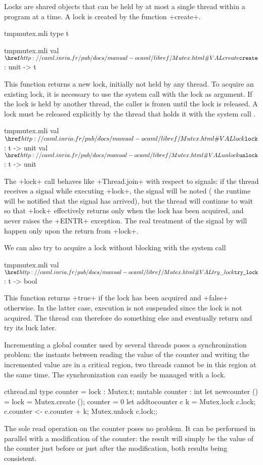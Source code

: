 Locks are shared objects that can be held by at most a single thread
within a program at a time. A lock is created by the function
\ml+create+.
%
\begin{codefile}{tmpmutex.mli}
  type t
\end{codefile}
%
\begin{listingcodefile}{tmpmutex.mli}
val $\libvalue{Mutex}{create}$ : unit -> t
\end{listingcodefile}
%
This function returns a new lock, initially not held by any thread.
To acquire an existing lock, it is necessary to use the system call
 with the lock as argument. If the lock is
held by another thread, the caller is frozen until the lock is released.
A lock must be released explicitly by the thread that holds it with
the system call .
%
\begin{listingcodefile}{tmpmutex.mli}
val $\libvalue{Mutex}{lock}$ : t -> unit
val $\libvalue{Mutex}{unlock}$ : t -> unit
\end{listingcodefile}
%
The \ml+lock+ call behaves like \ml+Thread.join+ with respect to
signals: if the thread receives a signal while executing \ml+lock+,
the signal will be noted ({\ie} the {\ocaml} runtime will be notified
that the signal has arrived), but the thread will continue to wait so
that \ml+lock+ effectively returns only when the lock has been
acquired, and never raises the \ml+EINTR+ exception.  The real
treatment of the signal by {\ocaml} will happen only upon the return
from \ml+lock+.

We can also try to acquire a lock without blocking with the system call
%
\begin{listingcodefile}{tmpmutex.mli}
val $\libvalue{Mutex}{try\_lock}$ : t -> bool
\end{listingcodefile}
%
This function returns \ml+true+ if the lock has been acquired and
\ml+false+ otherwise.  In the latter case, execution is not suspended
since the lock is not acquired. The thread can therefore do something
else and eventually return and try its luck later.

\begin{example}

Incrementing a global counter used by several threads poses a
synchronization problem: the instants between reading the value of the
counter and writing the incremented value are in a critical region,
{\ie} two threads cannot be in this region at the same time. The
synchronization can easily be managed with a lock.
%
\begin{listingcodefile}{cthread.ml}
type counter = { lock : Mutex.t; mutable counter : int }
let newcounter () = { lock = Mutex.create (); counter = 0 }
let addtocounter c k = 
  Mutex.lock c.lock; 
  c.counter <- c.counter + k; 
  Mutex.unlock c.lock;;
\end{listingcodefile}
%
The sole read operation on the counter poses no problem. It can be
performed in parallel with a modification of the counter: the result
will simply be the value of the counter just before or just after the
modification, both results being consistent.
\end{example}

